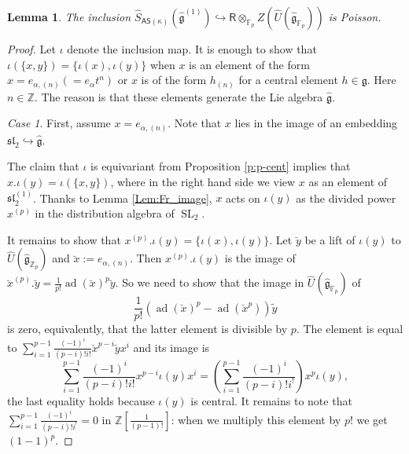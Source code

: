 \documentclass{amsart}
\newtheorem{Lem}[Thm]{Lemma}
\theoremstyle{definition}
\newcommand{\Ring}{\mathsf{R}}
\newcommand{\g}{\mathfrak{g}}
\newcommand{\hg}{\hat{\mathfrak{g}}}
\newcommand{\F}{\mathbb{F}}
\newcommand{\Z}{\mathbb{Z}}
\newcommand{\AS}{\mathsf{AS}}
\numberwithin{equation}{section}
\begin{document}
\begin{Lem}\label{Lem:iota_Poisson}
The inclusion $\widehat{S}_{\AS(\kappa)}(\hat{\g}^{(1)})\hookrightarrow \Ring\otimes_{\F_p}Z(\widehat{U}(\hat{\g}_{\F_p}))$ is Poisson.
\end{Lem}
\begin{proof}
Let $\iota$ denote the inclusion map. 
It is enough to show that $\iota(\{x,y\})=\{\iota(x),\iota(y)\}$ when $x$ is an element of the form $x=e_{\alpha,(n)}(=e_\alpha t^n)$ or $x$ is of the form $h_{(n)}$ for a central element $h\in \mathfrak{g}$. Here $n\in \Z$. 
The reason is that these elements generate the Lie algebra $\hg$. 

{\it Case 1}.
First, assume $x=e_{\alpha,(n)}$. Note that $x$ lies in the image of an embedding $\mathfrak{sl}_2\hookrightarrow \hat{\g}$.


The claim that $\iota$ is 
equivariant from Proposition \ref{p:p-cent} implies that 
$x.\iota(y)=\iota(\{x,y\})$, where in the right hand side we view $x$ as an element of $\mathfrak{sl}_2^{(1)}$. Thanks to Lemma \ref{Lem:Fr_image}, $x$ acts on $\iota(y)$ as the divided power $x^{(p)}$ in the distribution algebra of $\operatorname{SL}_2$. 

It remains to show that $x^{(p)}.\iota(y)=\{\iota(x),\iota(y)\}$.
Let $\breve{y}$ be a lift of $\iota(y)$ to $\widehat{U}(\hg_{\Z_p})$ and 
$\breve{x}:=e_{\alpha,(n)}$. Then $x^{(p)}.\iota(y)$ is the image of 
$\breve{x}^{(p)}.\breve{y}=\frac{1}{p!}\operatorname{ad}(\breve{x})^p \breve{y}$. 
So we need to show that the image in $\widehat{U}(\hg_{\F_p})$ of 
$$\frac{1}{p!}\left(\operatorname{ad}(\breve{x})^p-\operatorname{ad}(\breve{x}^p)\right)\tilde{y}$$
is zero, equivalently, that the latter element is divisible by $p$. The element is equal to $\sum_{i=1}^{p-1}\frac{(-1)^i}{(p-i)!i!}\breve{x}^{p-i}\breve{y}x^i$
and its image is 
$$\sum_{i=1}^{p-1}\frac{(-1)^i}{(p-i)!i!}x^{p-i}\iota(y)x^i=\left(\sum_{i=1}^{p-1}\frac{(-1)^i}{(p-i)!i^!}\right)x^p\iota(y),$$
the last equality holds because $\iota(y)$ is central. It remains to note that 
$\sum_{i=1}^{p-1}\frac{(-1)^i}{(p-i)!i^!}=0$ in $\Z[\frac{1}{(p-1)!}]$: when we multiply this element by $p!$ we get $(1-1)^p$. 


\end{proof}
\end{document}
